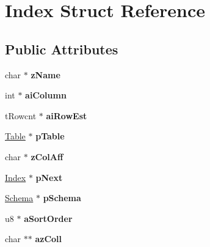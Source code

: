 \hypertarget{struct_index}{\section{Index Struct Reference}
\label{struct_index}
}
\subsection*{Public Attributes}
\begin{DoxyCompactItemize}
\item 
\hypertarget{struct_index_a8848cddf6e09f22e3b794ec019082ced}{char $\ast$ {\bfseries z\-Name}}\label{struct_index_a8848cddf6e09f22e3b794ec019082ced}

\item 
\hypertarget{struct_index_acbb125339b02ca6819dd2e382de2d639}{int $\ast$ {\bfseries ai\-Column}}\label{struct_index_acbb125339b02ca6819dd2e382de2d639}

\item 
\hypertarget{struct_index_aa408555f4da96ca1fae741ff6d33a3bf}{t\-Rowcnt $\ast$ {\bfseries ai\-Row\-Est}}\label{struct_index_aa408555f4da96ca1fae741ff6d33a3bf}

\item 
\hypertarget{struct_index_a01c6d4da27cba325ca58f333f87a6f44}{\hyperlink{struct_table}{Table} $\ast$ {\bfseries p\-Table}}\label{struct_index_a01c6d4da27cba325ca58f333f87a6f44}

\item 
\hypertarget{struct_index_af076df9f74dd836001c0a59d27274c0e}{char $\ast$ {\bfseries z\-Col\-Aff}}\label{struct_index_af076df9f74dd836001c0a59d27274c0e}

\item 
\hypertarget{struct_index_a115a17d236bd277d59dd5ea030954c3e}{\hyperlink{struct_index}{Index} $\ast$ {\bfseries p\-Next}}\label{struct_index_a115a17d236bd277d59dd5ea030954c3e}

\item 
\hypertarget{struct_index_af14f5ddd57eab2aba63dcb5db2aa92af}{\hyperlink{struct_schema}{Schema} $\ast$ {\bfseries p\-Schema}}\label{struct_index_af14f5ddd57eab2aba63dcb5db2aa92af}

\item 
\hypertarget{struct_index_a0a3fc87b53193995f59c9657443e9a99}{u8 $\ast$ {\bfseries a\-Sort\-Order}}\label{struct_index_a0a3fc87b53193995f59c9657443e9a99}

\item 
\hypertarget{struct_index_ab690ebb96c0329896b0fe2ab56813b88}{char $\ast$$\ast$ {\bfseries az\-Coll}}\label{struct_index_ab690ebb96c0329896b0fe2ab56813b88}


\end{DoxyCompactItemize}
